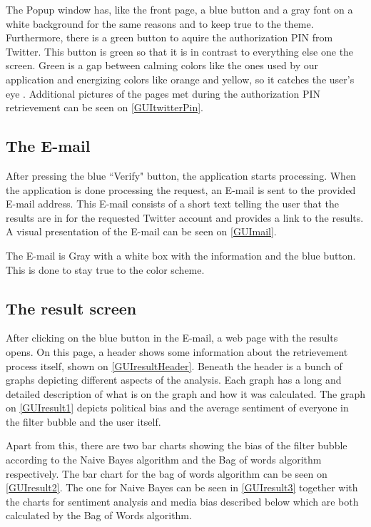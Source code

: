 
The Popup window has, like the front page, a blue button and a gray font on a
white background for the same reasons and to keep true to the theme.
Furthermore, there is a green button to aquire the authorization PIN from
Twitter. This button is green so that it is in contrast to everything else one
the screen. Green is a gap between calming colors like the ones used by our
application and energizing colors like orange and yellow, so it catches the
user's eye \citep[p. 60]{WebUI}. Additional pictures of the pages met during the
authorization PIN retrievement can be seen on \autoref{GUItwitterPin}.

\subsection{The E-mail}
After pressing the blue ``Verify" button, the application starts processing.
When the application is done processing the request, an E-mail is sent to the provided E-mail address. This E-mail consists of a short text telling the user
that the results are in for the requested Twitter account and provides a link to
the results.
A visual presentation of the E-mail can be seen on \autoref{GUImail}.


The E-mail is Gray with a white box with the information and the blue button.
This is done to stay true to the color scheme. 

\subsection{The result screen}
After clicking on the blue button in the E-mail, a web page with the results
opens. On this page, a header shows some information about the retrievement
process itself, shown on \autoref{GUIresultHeader}. Beneath
the header is a bunch of graphs depicting different aspects of the analysis.
Each graph has a long and detailed description of what is on the graph and how
it was calculated. The graph on \autoref{GUIresult1} depicts political bias and
the average sentiment of everyone in the filter bubble and the user itself. 


Apart from this, there are two bar charts showing the bias of the
filter bubble according to the Naive Bayes algorithm and the Bag of words
algorithm respectively. The bar chart for the bag of words algorithm can be seen
on \autoref{GUIresult2}. The one for Naive Bayes can be seen in
\autoref{GUIresult3} together with the charts for
sentiment analysis and media bias described below which are both calculated by the Bag of Words algorithm.

